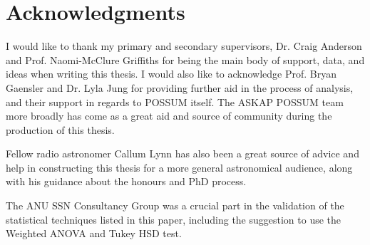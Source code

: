 \chapter*{Acknowledgments}

I would like to thank my primary and secondary supervisors, Dr. Craig Anderson and Prof. Naomi-McClure Griffiths for being the main body of support, data, and ideas when writing this thesis. I would also like to acknowledge Prof. Bryan Gaensler and Dr. Lyla Jung for providing further aid in the process of analysis, and their support in regards to POSSUM itself. The ASKAP POSSUM team more broadly has come as a great aid and source of community during the production of this thesis.

Fellow radio astronomer Callum Lynn has also been a great source of advice and help in constructing this thesis for a more general astronomical audience, along with his guidance about the honours and PhD process.

The ANU SSN Consultancy Group was a crucial part in the validation of the statistical techniques listed in this paper, including the suggestion to use the Weighted ANOVA and Tukey HSD test.